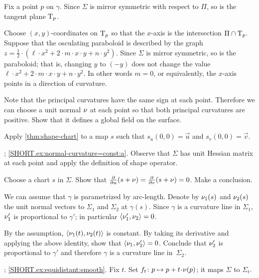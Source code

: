 \setcounter{eqtn}{0}

Fix a point $p$ on $\gamma$.
Since $\Sigma$ is mirror symmetric with respect to $\Pi$,
so is the tangent plane $\mathrm{T}_p$.

Choose $(x,y)$-coordinates on $\mathrm{T}_p$ so that the $x$-axis is the intersection $\Pi\cap  \mathrm{T}_p$.
Suppose that the osculating paraboloid is described by the graph 
$z=\tfrac12\cdot(\ell\cdot x^2+2\cdot m\cdot x\cdot y+n\cdot y^2)$.
Since $\Sigma$ is mirror symmetric, so is the paraboloid;
that is, changing $y$ to $(-y)$ does not change the value 
$\ell\cdot x^2+2\cdot m\cdot x\cdot y+n\cdot y^2$.
In other words $m=0$, or equivalently, the $x$-axis points in a direction of curvature.

 Note that the principal curvatures have the same sign at each point.
Therefore we can choose a unit normal $\nu$ at each point so that both principal curvatures are positive.
Show that it defines a global field on the surface.

Apply \ref{thm:shape-chart} to a map $s$ such that $s_u(0,0)=\vec u$ and $s_v(0,0)=\vec v$.

\parbf{\ref{ex:normal-curvature=const}}; \ref{SHORT.ex:normal-curvature=const:a}.
Observe that $\Sigma$ has unit Hessian matrix at each point and apply the definition of shape operator.

Choose a chart $s$ in $\Sigma$.
Show that
$\tfrac{\partial }{\partial u}(s+\nu)
=
\tfrac{\partial }{\partial v}(s+\nu)
=
0$.
Make a conclusion.

We can assume that $\gamma$ is parametrized by  arc-length.
Denote by $\nu_1(s)$ and $\nu_2(s)$ the unit normal vectors to $\Sigma_1$ and $\Sigma_2$ at $\gamma(s)$.
Since $\gamma$ is a curvature line in $\Sigma_1$,  
$\nu_1'$ is proportional to $\gamma'$;
in particular $\langle\nu_1',\nu_2\rangle=0$.

By the assumption, $\langle \nu_1(t),\nu_2(t)\rangle$ is constant.
By taking its derivative and applying the above identity, show that $\langle\nu_1,\nu_2'\rangle=0$.
Conclude that $\nu_2'$ is proportional to $\gamma'$
and therefore $\gamma$ is a curvature line in~$\Sigma_2$.

\parbf{\ref{ex:equidistant}};
\ref{SHORT.ex:equidistant:smooth}.
Fix $t$.
Set $f_t\:p\mapsto p+t\cdot\Norm(p)$; it maps $\Sigma$ to $\Sigma_t$.

